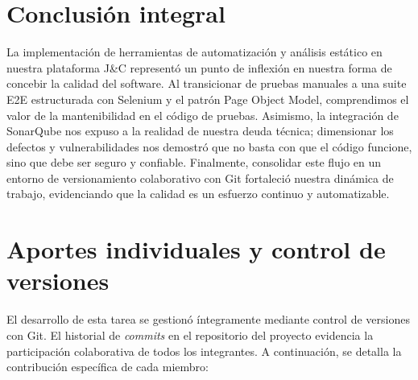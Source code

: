 \documentclass[12pt,a4paper]{article}
\begin{document}
\section{Conclusión integral}
La implementación de herramientas de automatización y análisis estático en nuestra plataforma J\&C representó un punto de inflexión en nuestra forma de concebir la calidad del software. Al transicionar de pruebas manuales a una suite E2E estructurada con Selenium y el patrón Page Object Model, comprendimos el valor de la mantenibilidad en el código de pruebas. Asimismo, la integración de SonarQube nos expuso a la realidad de nuestra deuda técnica; dimensionar los defectos y vulnerabilidades nos demostró que no basta con que el código funcione, sino que debe ser seguro y confiable. Finalmente, consolidar este flujo en un entorno de versionamiento colaborativo con Git fortaleció nuestra dinámica de trabajo, evidenciando que la calidad es un esfuerzo continuo y automatizable.

\section{Aportes individuales y control de versiones}
El desarrollo de esta tarea se gestionó íntegramente mediante control de versiones con Git. El historial de \textit{commits} en el repositorio del proyecto evidencia la participación colaborativa de todos los integrantes. A continuación, se detalla la contribución específica de cada miembro:
\end{document}

